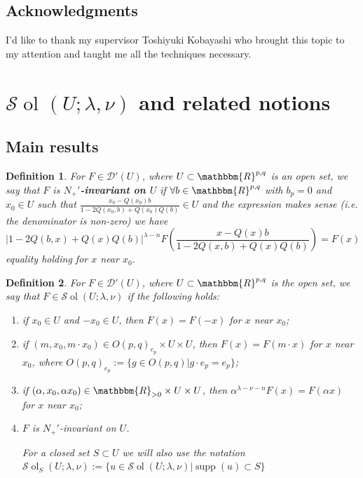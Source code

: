 \documentclass{article}
\newcommand{\assign}{:=}
\newcommand{\tmop}[1]{\ensuremath{\operatorname{#1}}}
\newcommand{\tmtextbf}[1]{{\bfseries{#1}}}
\newtheorem{definition}{Definition}
\numberwithin{definition}{section}
\numberwithin{lemma}{section}
\numberwithin{proposition}{section}
{\theorembodyfont{\rmfamily}\newtheorem{remark}{Remark}
\numberwithin{remark}{section}
}
\newcommand{\D}{\mathcal{D}} \newcommand{\supp}{supp}
\begin{document}
\subsection{Acknowledgments}

I'd like to thank my supervisor Toshiyuki Kobayashi who brought this topic to
my attention and taught me all the techniques necessary.

\section{$\mathcal{S} \tmop{ol}_{} ( U ; \lambda, \nu)$ and related
notions}\label{sec:sol}

\subsection{Main results}

\begin{definition}
  \label{def-n-nots:def-n+invar}For $F \in \D' (U)$, where $U \subset
  \mathbbm{R}^{p, q}$ is an open set, we say that $F$ is
  \tmtextbf{$N_+'$-invariant on $U$} if $\forall b \in \mathbbm{R}^{p, q}$
  with $b_p = 0$ and $x_0 \in U$ such that $\frac{x_0 - Q (x_0) b}{1 - 2 Q
  (x_0, b) + Q (x_0) Q (b)} \in U$ and the expression makes sense (i.e. the
  denominator is non-zero) we have
  \begin{equation}
    \label{eq-Nequiv} | 1 - 2 Q (b, x) + Q (x) Q (b) |^{\lambda - n} F \left(
    \frac{x - Q (x) b}{1 - 2 Q (x, b) + Q (x) Q (b)} \right) = F (x)
  \end{equation}
  equality holding for $x$ near $x_0$.
\end{definition}

\begin{definition}
  \label{sol:def-sol}For $F \in \D' (U)$, where $U \subset \mathbbm{R}^{p, q}$
  is the open set, we say that $F \in \mathcal{S} \tmop{ol} (U ; \lambda,
  \nu)$ if the following holds:
  \begin{enumerate}
    \item if $x_0 \in U$ and $- x_0 \in U$, then $F (x) = F (- x)$ for $x$
    near $x_0$;
    
    \item if $(m, x_0, m \cdot x_0) \in O (p, q)_{e_p} \times U \times U$,
    then $F (x) = F (m \cdot x)$ for $x$ near $x_0$, where $O (p, q)_{e_p}
    \assign \{g \in O (p, q) |g \cdot e_p = e_p \}$;
    
    \item if $(\alpha, x_0, \alpha x_0) \in \mathbbm{R}_{> 0} \times U \times
    U$, then $\alpha^{\lambda - \nu - n} F (x) = F (\alpha x)$ for $x$ near
    $x_0$;
    
    \item $F$ is $N_+'$-invariant on $U$.{
    
    }{
    
    }For a closed set $S \subset U$ we will also use the notation $\mathcal{S}
    \tmop{ol}_S ( U ; \lambda, \nu) \assign \{ u \in \mathcal{S} \tmop{ol} ( U
    ; \lambda, \nu) | \tmop{supp} ( u) \subset S \}$
  \end{enumerate}
\end{definition}
\end{document}
